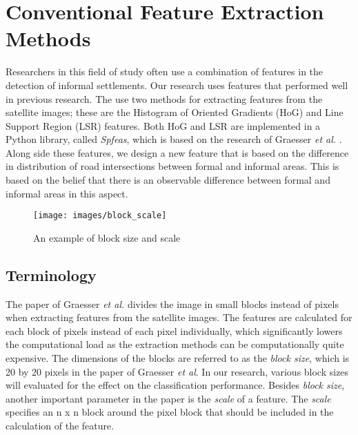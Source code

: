 \section{Conventional Feature Extraction Methods}
Researchers in this field of study often use a combination of features in the detection of informal settlements. Our research uses features that performed well in previous research. The use two methods for extracting features from the satellite images; these are the Histogram of Oriented Gradients (HoG) and Line Support Region (LSR) features. Both HoG and LSR are implemented in a Python library, called \textit{Spfeas}, which is based on the research of Graesser \textit{et al.} \cite{graesser2012image}. Along side these features, we design a new feature that is based on the difference 
in distribution of road intersections between formal and informal areas. This is based on the belief that there is an observable difference between formal and informal areas in this aspect.

\begin{figure}
	\centering
	\texttt{[image: images/block\_scale]}
	\caption{An example of block size and scale}
	\label{fig:block_scale}
\end{figure}


\subsection{Terminology}
The paper of Graesser \textit{et al.} divides the image in small blocks instead of pixels when extracting features from the satellite images. The features are calculated for each block of pixels instead of each pixel individually, which significantly lowers the computational load as the extraction methods can be computationally quite expensive. The dimensions of the blocks are referred to as the \textit{block size},  which is 20 by 20 pixels in the paper of Graesser \textit{et al}. In our research, various block sizes will evaluated for the effect on the classification performance. Besides \textit{block size}, another important parameter in the paper is the \textit{scale} of a feature. The \textit{scale} specifies an n x n block around the pixel block that should be included in the calculation of the feature.

